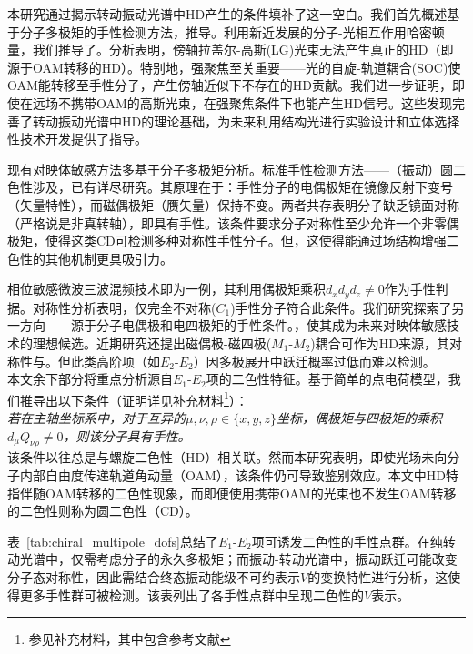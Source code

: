 \documentclass[reprint,aps,prl,twocolumn,superscriptaddress,groupedaddress]{revtex4-2}
\newcommand{\eomo}{$E_1$-$M_1$}
\newcommand{\eoet}{$E_1$-$E_2$}
\newcommand{\etet}{$E_2$-$E_2$}
\begin{document}
本研究通过揭示转动振动光谱中HD产生的条件填补了这一空白。我们首先概述基于分子多极矩的手性检测方法，推导。利用新近发展的分子-光相互作用哈密顿量\cite{Maslov2024,Maslov_Thesis}，我们推导了。分析表明，傍轴拉盖尔-高斯(LG)光束无法产生真正的HD（即源于OAM转移的HD）。特别地，强聚焦至关重要——光的自旋-轨道耦合(SOC)\cite{Bliokh2015}使OAM能转移至手性分子，产生傍轴近似下不存在的HD贡献。我们进一步证明，即使在远场不携带OAM的高斯光束，在强聚焦条件下也能产生HD信号。这些发现完善了转动振动光谱中HD的理论基础，为未来利用结构光进行实验设计和立体选择性技术开发提供了指导。

现有对映体敏感方法多基于分子多极矩分析。标准手性检测方法——（振动）圆二色性涉及，已有详尽研究\cite{Stephens1985,BUCKINGHAM1987,Mun2019,Lovesey2019}。其原理在于：手性分子的电偶极矩在镜像反射下变号（矢量特性），而磁偶极矩（赝矢量）保持不变。两者共存表明分子缺乏镜面对称（严格说是非真转轴），即具有手性。该条件要求分子对称性至少允许一个非零偶极矩，使得这类CD可检测多种对称性手性分子。但，这使得能通过场结构增强二色性的其他机制更具吸引力。

相位敏感微波三波混频技术\cite{Patterson2013,Patterson2013PRL}即为一例，其利用偶极矩乘积$d_xd_yd_z\neq 0$作为手性判据\cite{Patterson2013,Ordonez2018,Ayuso2022}。对称性分析表明，仅完全不对称($C_1$)手性分子符合此条件。我们研究探索了另一方向——源于分子电偶极和电四极矩的手性条件。，使其成为未来对映体敏感技术的理想候选。近期研究还提出磁偶极-磁四极($M_1$-$M_2$)耦合可作为HD来源，其对称性与\cite{Ji2024}。但此类高阶项（如\etet）因多极展开中跃迁概率过低而难以检测。\\
本文余下部分将重点分析源自\eoet 项的二色性特征。基于简单的点电荷模型，我们推导出以下条件（证明详见补充材料\footnote{参见补充材料，其中包含参考文献\cite{Maslov2024,Maslov_Thesis,Lax1975,Bliokh2015,Bliokh2023}}）：\\
\textit{若在主轴坐标系中，对于互异的$\mu, \nu, \rho \in \{x,y,z\}$坐标，偶极矩与四极矩的乘积$d_{\mu}Q_{\nu \rho} \neq 0$，则该分子具有手性。}\\
该条件以往总是与螺旋二色性（HD）相关联\cite{ANDREWS2004,Forbes2018}。然而本研究表明，即使光场未向分子内部自由度传递轨道角动量（OAM），该条件仍可导致鉴别效应。本文中HD特指伴随OAM转移的二色性现象，而即便使用携带OAM的光束也不发生OAM转移的二色性则称为圆二色性（CD）。

表~\ref{tab:chiral_multipole_dofs}总结了\eoet 项可诱发二色性的手性点群。在纯转动光谱中，仅需考虑分子的永久多极矩；而振动-转动光谱中，振动跃迁可能改变分子态对称性，因此需结合终态振动能级不可约表示$V$的变换特性进行分析，这使得更多手性群可被检测。该表列出了各手性点群中呈现二色性的$V$表示。
\end{document}
